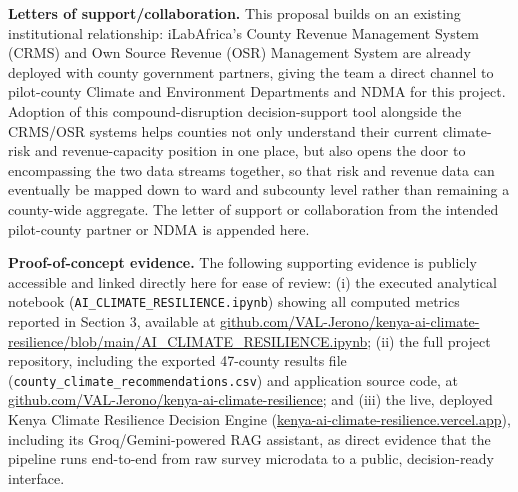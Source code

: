 \documentclass[12pt,a4paper]{article}
\begin{document}
\textbf{Letters of support/collaboration.} This proposal builds on an existing institutional relationship: iLabAfrica's County Revenue Management System (CRMS) and Own Source Revenue (OSR) Management System are already deployed with county government partners, giving the team a direct channel to pilot-county Climate and Environment Departments and NDMA for this project. Adoption of this compound-disruption decision-support tool alongside the CRMS/OSR systems helps counties not only understand their current climate-risk and revenue-capacity position in one place, but also opens the door to encompassing the two data streams together, so that risk and revenue data can eventually be mapped down to ward and subcounty level rather than remaining a county-wide aggregate. The letter of support or collaboration from the intended pilot-county partner or NDMA is appended here.

\textbf{Proof-of-concept evidence.} The following supporting evidence is publicly accessible and linked directly here for ease of review: (i) the executed analytical notebook (\texttt{AI\allowbreak\_\allowbreak CLIMATE\allowbreak\_\allowbreak RESILIENCE.ipynb}) showing all computed metrics reported in Section 3, available at \href{https://github.com/VAL-Jerono/kenya-ai-climate-resilience/blob/main/AI_CLIMATE_RESILIENCE.ipynb}{github.com/VAL-Jerono/kenya-ai-climate-resilience/blob/main/AI\_CLIMATE\_RESILIENCE.ipynb}; (ii) the full project repository, including the exported 47-county results file (\texttt{county\allowbreak\_\allowbreak climate\allowbreak\_\allowbreak recommendations.csv}) and application source code, at \href{https://github.com/VAL-Jerono/kenya-ai-climate-resilience}{github.com/VAL-Jerono/kenya-ai-climate-resilience}; and (iii) the live, deployed Kenya Climate Resilience Decision Engine (\href{https://kenya-ai-climate-resilience.vercel.app/}{kenya-ai-climate-resilience.vercel.app}), including its Groq/Gemini-powered RAG assistant, as direct evidence that the pipeline runs end-to-end from raw survey microdata to a public, decision-ready interface.
\end{document}
